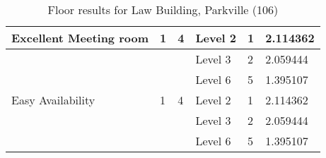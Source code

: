 \begin{table}[H]
{\begin{tabular}{|l|l|l|l|l|l|}
Excellent Meeting room & 1                       & 4                                & Level 2              & 1             & 2.114362        \\ \hline
                       &                         &                                  & Level 3              & 2             & 2.059444        \\ \hline
                       &                         &                                  & Level 6              & 5             & 1.395107        \\ \hline
Easy Availability      & 1                       & 4                                & Level 2              & 1             & 2.114362        \\ \hline
                       &                         &                                  & Level 3              & 2             & 2.059444        \\ \hline
                       &                         &                                  & Level 6              & 5             & 1.395107        \\ \hline
\end{tabular}
}
\caption{Floor results for Law Building, Parkville (106)}
\label{appendix:law_mr_floor}
\end{table}


